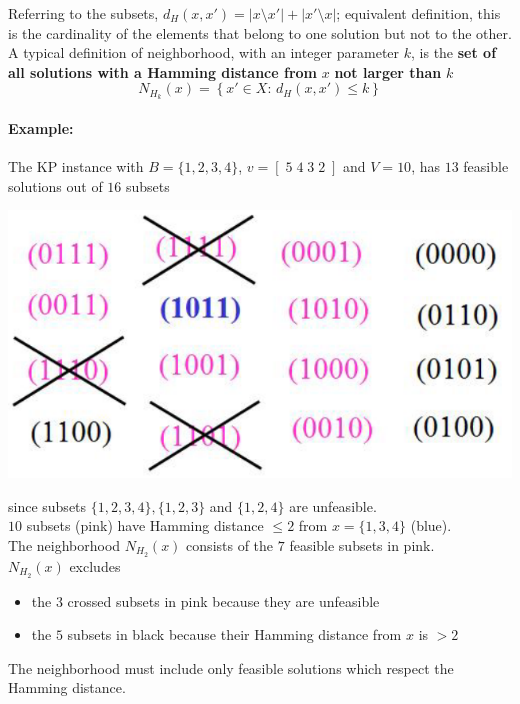 Referring to the subsets, $d_H (x, x') = |x \setminus x'| + |x' \setminus x|$; equivalent definition, this is the cardinality of the elements that belong to one solution but not to the other.\\

A typical definition of neighborhood, with an integer parameter $k$, is the \textbf{set of all solutions with a Hamming distance from} $x$ \textbf{not larger than} $k$
$$ N_{H_k} (x) = \left\{x' \in X: \, d_H (x, x') \leq k \right\} $$

\newpage

\paragraph{Example:} The KP instance with $B = \{1, 2, 3, 4\}$, $v = [ \; 5 \; 4 \; 3 \; 2 \; ]$ and $V = 10$, has $13$ feasible solutions out of $16$ subsets

\begin{center}
	\includegraphics[width=0.6\columnwidth]{img/KPN1}
\end{center}

since subsets $\{1, 2, 3, 4\}, \{1, 2, 3\}$ and $\{1, 2, 4\}$ are unfeasible.\\

$10$ subsets (pink) have Hamming distance $\leq 2$ from $x = \{1, 3, 4\}$ (blue).\\

The neighborhood $N_{H_2} (x)$ consists of the $7$ feasible subsets in pink.\\
$N_{H_2} (x)$ excludes
\begin{itemize}
	\item the $3$ crossed subsets in pink because they are unfeasible
	
	\item the $5$ subsets in black because their Hamming distance from $x$ is $> 2$
\end{itemize}

The neighborhood must include only feasible solutions which respect the Hamming distance.\\

